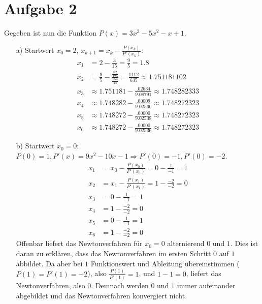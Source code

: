 \documentclass[11pt]{article}
\theoremstyle{plain}
\theoremstyle{definition}
\theoremstyle{remark}
\begin{document}
\section*{Aufgabe 2}

Gegeben ist nun die Funktion $ P(x) = 3x^3-5x^2-x+1 $. 
\begin{enumerate}
\item[a)] Startwert $ x_0 = 2 $, $ x_{k+1} = x_k - \frac{P(x_k)}{P'(x_k)} $: 
\begin{align*}
x_1 & = 2 - \frac{3}{15} = \frac{9}{5} = 1.8 \\ 
x_2 & = \frac{9}{5} - \frac{\frac{62}{125}}{\frac{254}{25}} = \frac{1112}{635} \approx 1.751 181 102 \\ 
x_3 & \approx 1.751 181 - \frac{.02634}{9.08791} \approx 1.748 282 333 \\ 
x_4 & \approx 1.748 282 - \frac{.00009}{9.02560} \approx 1.748 272 323 \\ 
x_5 & \approx 1.748 272 - \frac{.00000}{9.02538} \approx 1.748 272 323 \\ 
x_6 & \approx 1.748 272 - \frac{.00000}{9.02536} \approx 1.748 272 323 
\end{align*}
\item[b)] Startwert $ x_0 = 0 $: \\ 
$ P(0) = 1, P'(x) = 9x^2 -10x -1 \Longrightarrow P'(0)=-1, P'(0)=-2 $. 
\begin{align*}
x_1 &= x_0 - \frac{P(x_0)}{P'(x_0)} = 0 - \frac{1}{-1} = 1 \\ 
x_2 &= x_1 - \frac{P(x_1)}{P'(x_1)} = 1 - \frac{-2}{-2} = 0 \\ 
x_3 &= 0 - \frac{1}{-1} = 1 \\ 
x_4 &= 1 - \frac{-2}{-2} = 0 \\ 
x_5 &= 0 - \frac{1}{-1} = 1 \\ 
x_6 &= 1 - \frac{-2}{-2} = 0 
\end{align*} 
Offenbar liefert das Newtonverfahren für $ x_0=0 $ alternierend $ 0 $ und $ 1 $. Dies ist daran zu erklären, dass das Newtonverfahren im ersten Schritt $ 0 $ auf $ 1 $ abbildet. Da aber bei $ 1 $ Funktionswert und Ableitung übereinstimmen ($ P(1)=P'(1)=-2 $), also $ \frac{P(1)}{P'(1)}=1 $, und $ 1-1=0 $, liefert das Newtonverfahren, also $ 0 $. Demnach werden $ 0 $ und $ 1 $ immer aufeinander abgebildet und das Newtonverfahren konvergiert nicht. 
\end{enumerate}
\end{document}
